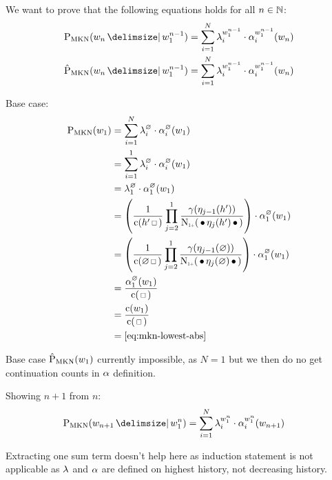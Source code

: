 \begin{draft}
We want to prove that the following equations holds for all $n \in \mathbb{N}$:
\begin{align}
  \ProbMKN {w_n}{w_1^{n-1}} &= \sum_{i=1}^N \SumWeight_i^{w_1^{n-1}} \cdot \SumArg_i^{w_1^{n-1}}(w_n) \\
  \ProbMKN*{w_n}{w_1^{n-1}} &= \sum_{i=1}^N \SumWeight_i^{w_1^{n-1}} \cdot \SumArg_i^{w_1^{n-1}}(w_n)
\end{align}

\noindent
Base case:
\begin{subequations}
  \begin{align}
    \ProbMKN{w_1} &= \sum_{i = 1}^N \SumWeight_i^\varnothing \cdot \SumArg_i^\varnothing(w_1) \\
                  &= \sum_{i = 1}^1 \SumWeight_i^\varnothing \cdot \SumArg_i^\varnothing(w_1) \\
                  &= \SumWeight_1^\varnothing \cdot \SumArg_1^\varnothing(w_1) \\
                  &= \left( \frac{1}{\Count(\SeenHistory \Skp)} \prod_{j = 2}^1 \frac{\gamma(\History_{j-1}(\SeenHistory))}{\ContCountIp(\WSkp \History_j(\SeenHistory) \WSkp)} \right) \cdot \SumArg_1^\varnothing(w_1) \\
                  &= \left( \frac{1}{\Count(\varnothing \Skp)} \prod_{j = 2}^1 \frac{\gamma(\History_{j-1}(\varnothing))}{\ContCountIp(\WSkp \History_j(\varnothing) \WSkp)} \right) \cdot \SumArg_1^\varnothing(w_1) \\
                  &= \frac{\SumArg_1^\varnothing(w_1)}{\Count(\Skp)} \\
                  &= \frac{\Count(w_1)}{\Count(\Skp)} \\
                  &= \text{\cref{eq:mkn-lowest-abs}}
  \end{align}
\end{subequations}

Base case $\ProbMKN*{w_1}$ currently impossible, as $N = 1$ but we then do no
get continuation counts in $\alpha$ definition.

Showing $n+1$ from $n$:
\begin{align}
  \ProbMKN{w_{n+1}}{w_1^n} &= \sum_{i = 1}^N \SumWeight_i^{w_1^n} \cdot \SumArg_i^{w_1^n}(w_{n+1})
\end{align}

Extracting one sum term doesn't help here as induction statement is not
applicable as $\lambda$ and $\alpha$ are defined on highest history, not
decreasing history.
\end{draft}

